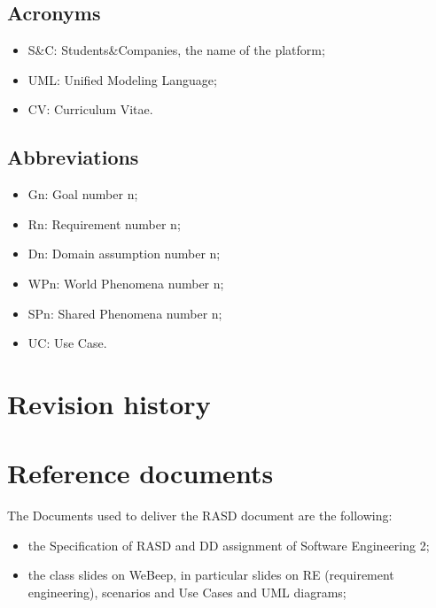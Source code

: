		\subsection{Acronyms}
			\begin{itemize}
				\item S\&C: Students\&Companies, the name of the platform;
				\item UML: Unified Modeling Language;
				\item CV: Curriculum Vitae.
			\end{itemize}
		\subsection{Abbreviations}
			\begin{itemize}
				\item Gn: Goal number n;
				\item Rn: Requirement number n;
				\item Dn: Domain assumption number n;
				\item WPn: World Phenomena number n;
				\item SPn: Shared Phenomena number n;
				\item UC: Use Case.
			\end{itemize}
	\section{Revision history}
		\begin{center}
		\end{center}
	\section{Reference documents}
		The Documents used to deliver the RASD document are the following:
		\begin{itemize}
			\item the Specification of RASD and DD assignment of Software Engineering 2;
			\item the class slides on WeBeep, in particular slides on RE (requirement engineering), scenarios and Use Cases and UML diagrams;
		\end{itemize}
